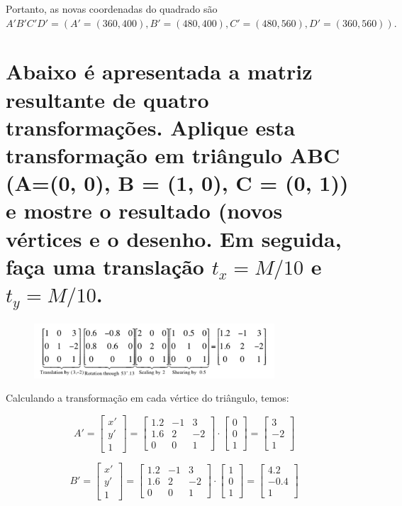 \documentclass{article}
\begin{document}
Portanto, as novas coordenadas do quadrado são $A'B'C'D' = (A'=(360, 400), B'=(480, 400), C'=(480, 560), D'=(360, 560)).$

\section{Abaixo é apresentada a matriz resultante de quatro transformações. Aplique esta transformação em triângulo ABC (A=(0, 0), B = (1, 0), C = (0, 1)) e mostre o resultado (novos vértices e o desenho. Em seguida, faça uma translação $t_x = M/10$ e $t_y = M / 10$.}

\begin{figure}[ht!]
	\centering
	\includegraphics[width=0.8\textwidth]{img/img2.png}
\end{figure}

Calculando a transformação em cada vértice do triângulo, temos:

$$A' = \begin{bmatrix}
x'\\
y'\\
1
\end{bmatrix} = \begin{bmatrix}
1.2 & -1 & 3\\
1.6 & 2 & -2\\
0 & 0 & 1
\end{bmatrix} \cdot \begin{bmatrix}
0\\
0\\
1
\end{bmatrix} = \begin{bmatrix}
3\\
-2\\
1
\end{bmatrix}$$

$$B' = \begin{bmatrix}
	x'\\
	y'\\
	1
\end{bmatrix} = \begin{bmatrix}
	1.2 & -1 & 3\\
	1.6 & 2 & -2\\
	0 & 0 & 1
\end{bmatrix} \cdot \begin{bmatrix}
	1\\
	0\\
	1
\end{bmatrix} = \begin{bmatrix}
	4.2\\
	-0.4\\
	1
\end{bmatrix}$$
\end{document}

